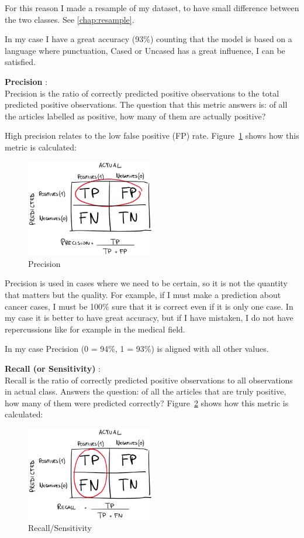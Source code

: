 For this reason I made a resample of my dataset, to have small difference between the two classes. See \ref{chap:resample}.

In my case I have a great accuracy (93\%) counting that the model is based on a language where punctuation, Cased or Uncased has a great influence, I can be satisfied.


\textbf{Precision} \cite{brownlee_how_2020}:\\
Precision is the ratio of correctly predicted positive observations to the total predicted positive observations. 
The question that this metric answers is: 
of all the articles labelled as positive, how many of them are actually positive?

High precision relates to the low false positive (FP) rate. 
Figure~\ref{fig:fig_pre} shows how this metric is calculated:
\begin{figure}[ht!]
\centering
\includegraphics[width=0.5\textwidth]{images/prec.png}
\caption{Precision}
\label{fig:fig_pre}
\end{figure}
\FloatBarrier

Precision is used in cases where we need to be certain, so it is not the quantity that matters but the quality. For example, if I must make a prediction about cancer cases, I must be 100\% sure that it is correct even if it is only one case.
In my case it is better to have great accuracy, but if I have mistaken, I do not have repercussions like for example in the medical field.

In my case Precision (0 = 94\%, 1 = 93\%) is aligned with all other values.

\textbf{Recall (or Sensitivity)} \cite{brownlee_how_2020}:\\
Recall is the ratio of correctly predicted positive observations to all observations in actual class. Answers the question:
of all the articles that are truly positive, how many of them were predicted correctly? 
Figure~\ref{fig:fig_rec} shows how this metric is calculated:
\begin{figure}[ht!]
\centering
\includegraphics[width=0.5\textwidth]{images/rec.png}
\caption{Recall/Sensitivity}
\label{fig:fig_rec}
\end{figure}
\FloatBarrier

